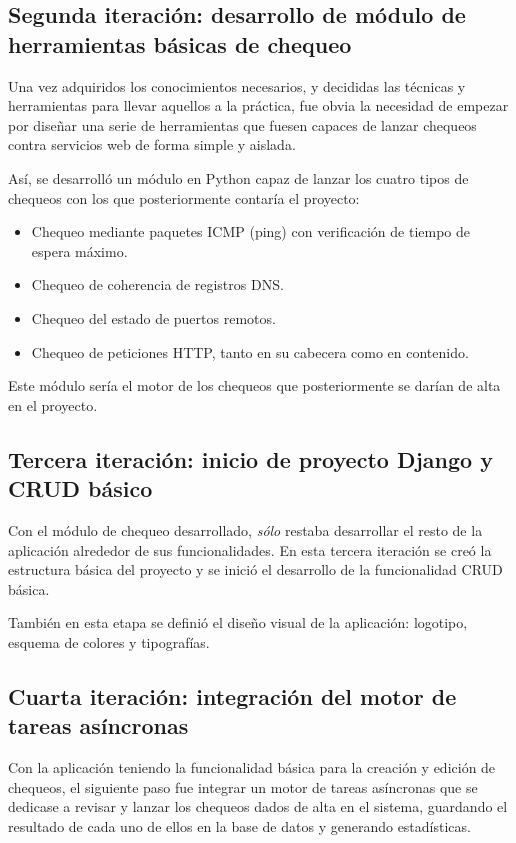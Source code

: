 \subsection{Segunda iteración: desarrollo de módulo de herramientas básicas de
  chequeo}

Una vez adquiridos los conocimientos necesarios, y decididas las técnicas y
herramientas para llevar aquellos a la práctica, fue obvia la necesidad de
empezar por diseñar una serie de herramientas que fuesen capaces de lanzar
chequeos contra servicios web de forma simple y aislada.

Así, se desarrolló un módulo en Python capaz de lanzar los cuatro tipos de
chequeos con los que posteriormente contaría el proyecto:
\begin{itemize}
\item Chequeo mediante paquetes \ac{ICMP} (ping) con verificación de tiempo de espera máximo.
\item Chequeo de coherencia de registros \ac{DNS}.
\item Chequeo del estado de puertos remotos.
\item Chequeo de peticiones \ac{HTTP}, tanto en su cabecera como en contenido.
\end{itemize}

Este módulo sería el motor de los chequeos que posteriormente se darían de alta
en el proyecto.

\subsection{Tercera iteración: inicio de proyecto Django y CRUD básico}

Con el módulo de chequeo desarrollado, \textit{sólo} restaba desarrollar el
resto de la aplicación alrededor de sus funcionalidades. En esta tercera
iteración se creó la estructura básica del proyecto y se inició el desarrollo de
la funcionalidad \ac{CRUD} básica.

También en esta etapa se definió el diseño visual de la aplicación: logotipo,
esquema de colores y tipografías.

\subsection{Cuarta iteración: integración del motor de tareas asíncronas}

Con la aplicación teniendo la funcionalidad básica para la creación y edición de
chequeos, el siguiente paso fue integrar un motor de tareas asíncronas que se
dedicase a revisar y lanzar los chequeos dados de alta en el sistema, guardando
el resultado de cada uno de ellos en la base de datos y generando estadísticas.

